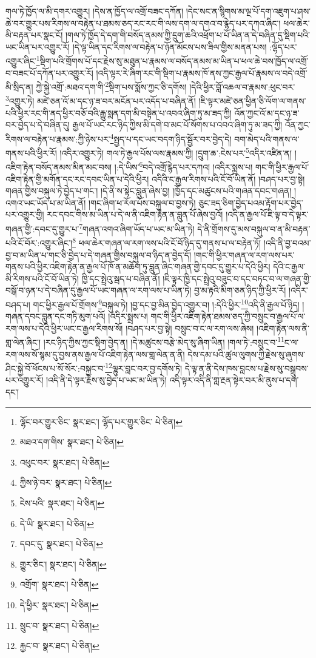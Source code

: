 གལ་ཏེ་ཁྱོད་ལ་མི་དགར་འགྱུར། །དེས་ན་ཁྱོད་ལ་འགྲོ་བཟང་དཀོན། །དེང་སང་ན་སྙིགས་མ་ལྔ་པོ་དག་འཇུག་པ་ཤས་ཆེ་བར་གྱུར་པས་རིགས་ལ་བརྟེན་པ་ཐམས་ཅད་རང་རང་གི་ལས་དག་ལ་དགའ་བ་རྙེད་པར་དཀའ་ཞིང་། ཕལ་ཆེར་མི་བརྟན་པར་སྣང་ངོ། །གལ་ཏེ་ཁྱོད་དེ་དག་གི་བསོད་ནམས་ཀྱི་དྲུག་ཆའི་འཕྲོག་པ་པོ་ཡིན་ན་དེ་བཞིན་དུ་སྡིག་པའི་ཡང་ཡིན་པར་འགྱུར་རོ། །དེ་ལྟ་ཡིན་དང་རིགས་ལ་བརྟེན་པ་ཉོན་མོངས་པས་ཟིལ་གྱིས་མནན་པས། :ལྷོད་པར་འགྱུར་ཞིང་\footnote{ལྷོང་བར་གྱུར་ཅིང་  སྣར་ཐང་། ལྷོད་པར་གྱུར་ཅིང་  པེ་ཅིན། }སྡིག་པའི་གྲོགས་པོ་དང་རྗེས་སུ་མཐུན་པ་རྣམས་ལ་བསོད་ནམས་མ་ཡིན་པ་ཕལ་ཆེ་བས་ཁྱོད་ལ་འགྲོ་བ་བཟང་པོ་དཀོན་པར་འགྱུར་རོ། །འདི་ལྟར་རེ་ཞིག་རང་གི་སྡིག་པ་རྣམས་ཁོ་ནས་ཀྱང་རྒྱལ་པོ་རྣམས་ལ་བདེ་འགྲོ་མི་སྲིད་ན། ཀྱེ་སྐྱེ་འགྲོ་:མཐའ་དག་གི་\footnote{མཐའ་དག་གིས་  སྣར་ཐང་།  པེ་ཅིན། }སྡིག་པས་སྨོས་ཀྱང་ཅི་དགོས། །དེའི་ཕྱིར་བློ་འཆལ་བ་རྣམས་:ཕུང་བར་\footnote{འཕུང་བར་  སྣར་ཐང་།  པེ་ཅིན། }འགྱུར་ཏེ། མཛེ་ཅན་འོ་མ་དང་ཉ་ཟ་བར་མངོན་པར་འདོད་པ་བཞིན་ནོ། །ཇི་ལྟར་མཛེ་ཅན་ཕྱིན་ཅི་ལོག་ལ་གནས་པའི་ཕྱིར་རང་གི་ནད་ཕྱིར་བཅོ་བའི་རྒྱུ་སྨན་དག་མི་བསྟེན་པ་འབའ་ཞིག་ཏུ་མ་ཟད་ཀྱི། འོན་ཀྱང་འོ་མ་དང་ཉ་ཟ་བར་བྱེད་པ་དེ་བཞིན་དུ། རྒྱལ་པོ་ཡང་རང་ཉིད་ཀྱིས་མི་དགེ་བ་མང་པོ་སོགས་པ་འབའ་ཞིག་ཏུ་མ་ཟད་ཀྱི། འོན་ཀྱང་རིགས་ལ་བརྟེན་པ་རྣམས་:ཀྱི་ཉེས་པར་\footnote{ཀྱིས་ཉེ་བར་  སྣར་ཐང་།  པེ་ཅིན། }སྤྱད་པ་དང་ཡང་བདག་ཉིད་སྦྱོར་བར་བྱེད་དེ། བག་མེད་པའི་གནས་ལ་གནས་པའི་ཕྱིར་རོ། །འདིར་འགྱུར་ཏེ། གལ་ཏེ་རྒྱལ་པོས་ལས་རྣམས་ཀྱི། །དྲུག་ཆ་:ངེས་པར་\footnote{ངེས་པའི་  སྣར་ཐང་།  པེ་ཅིན། }འདིར་འཛིན་ན། །འཇིག་རྟེན་བསོད་ནམས་མིན་མང་བས། །:དེ་ཡིས་\footnote{དེ་ཡི་  སྣར་ཐང་།  པེ་ཅིན། }བདེ་འགྲོ་རྙེད་པར་དཀའ། །འདིར་སྨྲས་པ། གང་གི་ཕྱིར་རྒྱལ་པོ་འཇིག་རྟེན་གྱི་མགོན་དང་རང་དབང་ཡིན་པ་དེའི་ཕྱིར། འདིའི་ང་རྒྱལ་རིགས་པའི་ངོ་བོ་ཡིན་ནོ། །བཤད་པར་བྱ་སྟེ། གཞན་གྱིས་བསྐུལ་ཏེ་བྱེད་པ་གང་། །དེ་ནི་ས་སྟེང་བླུན་ཞེས་བྱ། །ཁྱོད་དང་མཚུངས་པའི་གཞན་དབང་གཞན། །འགའ་ཡང་ཡོད་པ་མ་ཡིན་ནོ། །གང་ཞིག་ཕ་རོལ་པོས་བསྐུལ་བ་བྱས་ཏེ། ཅུང་ཟད་ཅིག་བྱེད་པའམ་རྟོག་པར་བྱེད་པར་འགྱུར་གྱི། རང་དབང་གིས་མ་ཡིན་པ་དེ་ལ་ནི་འཇིག་རྟེན་ན་བླུན་པོ་ཞེས་བྱའོ། །འདི་ན་རྒྱལ་པོ་ཇི་ལྟ་བ་དེ་ལྟར་གཞན་གྱི་:དབང་དུ་གྱུར་པ་\footnote{དབང་དུ་  སྣར་ཐང་།  པེ་ཅིན། }གཞན་འགའ་ཞིག་ཡོད་པ་ཡང་མ་ཡིན་ཏེ། དེ་ནི་གྲོགས་དུ་མས་བསྐུལ་བ་ན་མི་བརྟན་པའི་ངོ་བོར་:འགྱུར་ཞིང་།\footnote{གྱུར་ཅིང་།  སྣར་ཐང་།  པེ་ཅིན། } ཕལ་ཆེར་གཞན་ལ་རག་ལས་པའི་ངོ་བོ་ཉིད་དུ་གནས་པ་ལ་བརྟེན་ཏོ། །འདི་ནི་བྱ་བའམ་བྱ་བ་མ་ཡིན་པ་གང་ཅི་བྱེད་པ་དེ་གཞན་གྱིས་བསྐུལ་བ་ཉིད་ན་བྱེད་དོ། །གང་གི་ཕྱིར་གཞན་ལ་རག་ལས་པར་གནས་པའི་ཕྱིར་འཇིག་རྟེན་ན་རྒྱལ་པོ་ཁོ་ན་མཆོག་ཏུ་བླུན་ཞིང་གཞན་གྱི་དབང་དུ་གྱུར་པ་དེའི་ཕྱིར། དེའི་ང་རྒྱལ་མི་རིགས་པའི་ངོ་བོ་ཡིན་ཏེ། ཁྱི་དང་སྤྲེའུ་སྦད་པ་བཞིན་ནོ། །ཇི་ལྟར་ཁྱི་དང་སྤྲེའུ་བཟུང་བ་དང་བཏང་བ་ལ་གཞན་གྱི་བསྒོ་བ་ཉན་པ་དེ་བཞིན་དུ་རྒྱལ་པོ་ཡང་གཞན་ལ་རག་ལས་པ་ཡིན་ཏེ། བྱ་མ་རྟའི་མིག་ཅན་ཉིད་ཀྱི་ཕྱིར་རོ། །འདིར་བཤད་པ། གང་ཕྱིར་རྒྱལ་པོ་གྲོགས་\footnote{འགྲོག་  སྣར་ཐང་།  པེ་ཅིན། }བསྐུལ་ཏེ། །བྱ་དང་བྱ་མིན་བྱེད་འགྱུར་བ། །:དེའི་ཕྱིར་\footnote{དེ་ཕྱིར་  སྣར་ཐང་།  པེ་ཅིན། }འདི་ནི་རྒྱལ་པོ་ཉིད། །གཞན་དབང་བླུན་དང་གཏི་མུག་པའོ། །འདིར་སྨྲས་པ། གང་གི་ཕྱིར་འཇིག་རྟེན་ཐམས་ཅད་ཀྱི་བསྲུང་བ་རྒྱལ་པོ་ལ་རག་ལས་པ་དེའི་ཕྱིར་ཡང་ང་རྒྱལ་རིགས་སོ། །བཤད་པར་བྱ་སྟེ། བསྲུང་བ་ང་ལ་རག་ལས་ཞེས། །འཇིག་རྟེན་ལས་ནི་གླ་ལེན་ཞིང་། །རང་ཉིད་ཀྱིས་ཀྱང་སྡིག་བྱེད་ན། །དེ་མཚུངས་བརྩེ་མེད་སུ་ཞིག་ཡིན། །གལ་ཏེ་:བསྲུང་བ་\footnote{སྲུང་བ་  སྣར་ཐང་།  པེ་ཅིན། }ང་ལ་རག་ལས་སོ་སྙམ་དུ་བྱས་ནས་རྒྱལ་པོ་འཇིག་རྟེན་ལས་གླ་ལེན་ན་ནི། དེས་དམ་པའི་ཚུལ་ལུགས་ཀྱི་རྗེས་སུ་ཞུགས་ཤིང་སྐྱེ་བོ་ཕོངས་པ་སོ་སོར་:བསྐྱང་བ་\footnote{རྐྱང་བ་  སྣར་ཐང་།  པེ་ཅིན། }ལྷུར་བླང་བར་བྱ་དགོས་ཏེ། དེ་ལྟ་ན་ནི་དེས་ཁས་བླངས་པ་རྗེས་སུ་བསྒྲུབས་པར་འགྱུར་རོ། །འདི་ནི་དེ་ལྟར་རྗེས་སུ་བྱེད་པ་ཡང་མ་ཡིན་ཏེ། འདི་ལྟར་འདི་ནི་གླ་རྔན་སྟེར་བར་མི་ནུས་པ་དག་དང་། 